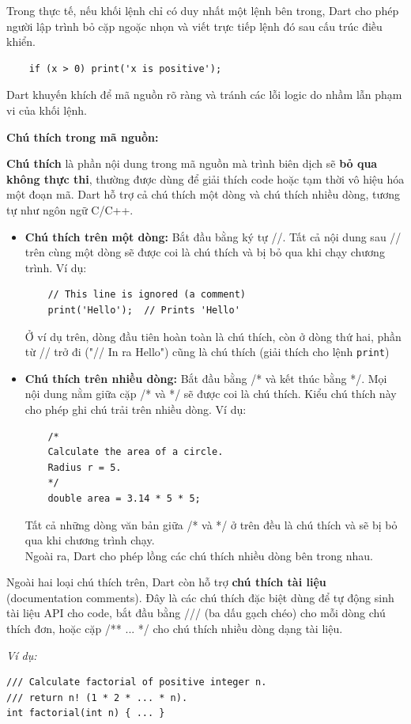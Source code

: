 \documentclass[../DoAn.tex]{subfiles}
\numberwithin{figure}{chapter}
\begin{document}
Trong thực tế, nếu khối lệnh chỉ có duy nhất một lệnh bên trong, Dart cho phép người lập trình bỏ cặp ngoặc nhọn và viết trực tiếp lệnh đó sau cấu trúc điều khiển.
\begin{lstlisting}
    if (x > 0) print('x is positive');
\end{lstlisting}
Dart khuyến khích để mã nguồn rõ ràng và tránh các lỗi logic do nhầm lẫn phạm vi của khối lệnh.

\textbf{Chú thích trong mã nguồn:} 

\textbf{Chú thích} là phần nội dung trong mã nguồn mà trình biên dịch sẽ \textbf{bỏ qua không thực thi}, thường được dùng để giải thích code hoặc tạm thời vô hiệu hóa một đoạn mã. Dart hỗ trợ cả chú thích một dòng và chú thích nhiều dòng, tương tự như ngôn ngữ C/C++. 
\begin{itemize}
    \item \textbf{Chú thích trên một dòng: } Bắt đầu bằng ký tự //. Tất cả nội dung sau // trên cùng một dòng sẽ được coi là chú thích và bị bỏ qua khi chạy chương trình. Ví dụ:
    \begin{lstlisting}
    // This line is ignored (a comment)
    print('Hello');  // Prints 'Hello'
    \end{lstlisting}
    Ở ví dụ trên, dòng đầu tiên hoàn toàn là chú thích, còn ở dòng thứ hai, phần từ // trở đi ("// In ra Hello") cũng là chú thích (giải thích cho lệnh \texttt{print})
    \item \textbf{Chú thích trên nhiều dòng: } Bắt đầu bằng /* và kết thúc bằng */. Mọi nội dung nằm giữa cặp /* và */ sẽ được coi là chú thích. Kiểu chú thích này cho phép ghi chú trải trên nhiều dòng. Ví dụ:
    \begin{lstlisting}
    /* 
    Calculate the area of a circle.
    Radius r = 5.
    */
    double area = 3.14 * 5 * 5;
    \end{lstlisting}
    Tất cả những dòng văn bản giữa /* và */ ở trên đều là chú thích và sẽ bị bỏ qua khi chương trình chạy. \\
    Ngoài ra, Dart cho phép lồng các chú thích nhiều dòng bên trong nhau.
\end{itemize}

Ngoài hai loại chú thích trên, Dart còn hỗ trợ \textbf{chú thích tài liệu} (documentation comments). Đây là các chú thích đặc biệt dùng để tự động sinh tài liệu API cho code, bắt đầu bằng /// (ba dấu gạch chéo) cho mỗi dòng chú thích đơn, hoặc cặp /** ... */ cho chú thích nhiều dòng dạng tài liệu. 

\textit{Ví dụ:} 
\begin{lstlisting}
/// Calculate factorial of positive integer n.
/// return n! (1 * 2 * ... * n).
int factorial(int n) { ... }    
\end{lstlisting}
\end{document}
